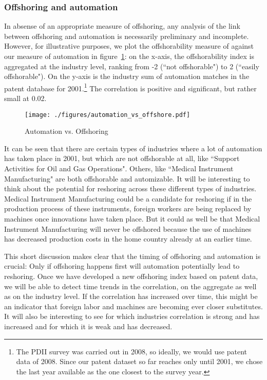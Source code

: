 \documentclass[11pt,a4paper,fleqn]{article}
\begin{document}
\subsubsection*{Offshoring and automation}

In absense of an appropriate measure of offshoring, any analysis of the link between offshoring and automation is necessarily preliminary and incomplete. However, for illustrative purposes, we plot the offshorability measure of \cite{BK2013} against our measure of automation in figure~\ref{fig:offshoring_vs_automation}: on the x-axis, the offshorability index is aggregated at the industry level, ranking from -2 (``not offshorable") to 2 (``easily offshorable"). On the y-axis is the industry sum of automation matches in the patent database for 2001.\footnote{The PDII survey was carried out in 2008, so ideally, we would use patent data of 2008. Since our patent dataset so far reaches only until 2001, we chose the last year available as the one closest to the survey year.} The correlation is positive and significant, but rather small at 0.02.

\begin{figure}
	\centering
	\caption{Automation vs. Offshoring}
	\label{fig:offshoring_vs_automation}
	\texttt{[image: ./figures/automation\_vs\_offshore.pdf]}
\end{figure}

It can be seen that there are certain types of industries where a lot of automation has taken place in 2001, but which are not offshorable at all, like ``Support Activities for Oil and Gas Operations". Others, like ``Medical Instrument Manufacturing" are both offshorable and automizable. It will be interesting to think about the potential for reshoring across these different types of industries. Medical Instrument Manufacturing could be a candidate for reshoring if in the production process of these instruments, foreign workers are being replaced by machines once innovations have taken place. But it could as well be that Medical Instrument Manufacturing will never be offshored because the use of machines has decreased production costs in the home country already at an earlier time.

This short discussion makes clear that the timing of offshoring and automation is crucial: Only if offshoring happens first will automation potentially lead to reshoring. Once we have developed a new offshoring index based on patent data, we will be able to detect time trends in the correlation, on the aggregate as well as on the industry level. If the correlation has increased over time, this might be an indicator that foreign labor and machines are becoming ever closer substitutes. It will also be interesting to see for which industries correlation is strong and has increased and for which it is weak and has decreased.
\end{document}
